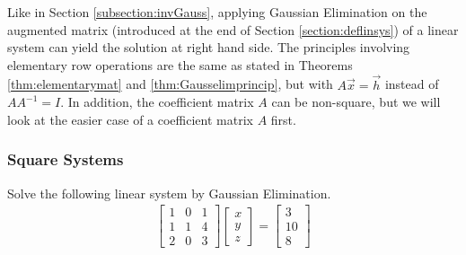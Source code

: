 Like in Section \ref{subsection:invGauss}, applying Gaussian Elimination on the augmented matrix (introduced at the end of Section \ref{section:deflinsys}) of a linear system can yield the solution at right hand side. The principles involving elementary row operations are the same as stated in Theorems \ref{thm:elementarymat} and \ref{thm:Gausselimprincip}, but with $A\vec{x} = \vec{h}$ instead of $AA^{-1} = I$. In addition, the coefficient matrix $A$ can be non-square, but we will look at the easier case of a coefficient matrix $A$ first.

\subsubsection{Square Systems}
\begin{exmp}
Solve the following linear system by Gaussian Elimination.
\begin{align*}
\begin{bmatrix}
1 & 0 & 1 \\
1 & 1 & 4 \\
2 & 0 & 3
\end{bmatrix}
\begin{bmatrix}
x \\
y \\
z
\end{bmatrix}
=
\begin{bmatrix}
3 \\
10 \\
8
\end{bmatrix}
\end{align*}
\end{exmp}
